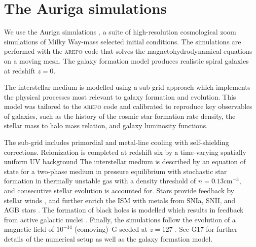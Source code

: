 \documentclass[a4paper,fleqn,usenatbib]{mnras}
\begin{document}
\section{The Auriga simulations}
\label{sec:auriga}
We use the Auriga simulations \citep[][hereafter G17]{2017MNRAS.467..179G}, a
suite of high-resolution cosmological zoom simulations of Milky Way-mass
selected initial conditions. The simulations are performed with the \textsc{arepo} 
\citep{2010MNRAS.401..791S, 2016MNRAS.455.1134P} code that solves the 
magnetohydrodynamical equations on a moving mesh. The galaxy formation model 
produces realistic spiral galaxies at redshift $z=0$.

The interstellar medium is modelled using a sub-grid approach which implements
the physical processes most relevant to galaxy formation and evolution.
This model was tailored to the \textsc{arepo} code and calibrated to reproduce
key observables of galaxies, such as the history of the cosmic star formation rate
density, the stellar mass to halo mass relation, and galaxy luminosity functions.

The sub-grid includes primordial and metal-line cooling with self-shielding
corrections. Reionization is completed at redshift six by a time-varying
spatially uniform UV background \citep{2009ApJ...703.1416F, 2013MNRAS.436.3031V}
The interstellar medium is described by an equation of state for a two-phase medium
in pressure equilibrium \citep{2003MNRAS.339..289S} with stochastic star formation
in thermally unstable gas with a density threshold of $n = 0.13 \text{cm}^{-3}$,
and consecutive stellar evolution is accounted for. Stars provide feedback by
stellar winds \citep{2014MNRAS.437.1750M, 2017MNRAS.467..179G}, and further
enrich the ISM with metals from SNIa, SNII, and AGB stars \citep{2013MNRAS.436.3031V}.
The formation of black holes is modelled which results in feedback from active
galactic nuclei \citep{2005MNRAS.361..776S, 2014MNRAS.437.1750M, 2017MNRAS.467..179G}.
Finally, the simulations follow the evolution of a magnetic field of $10^{-14}$
(comoving)~G seeded at $z = 127$ \citep{2013MNRAS.432..176P, 2014ApJ...783L..20P}.
See G17 for further details of the numerical setup as well as the galaxy formation
model.
\end{document}
